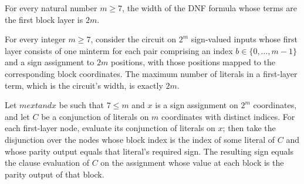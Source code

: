 \begin{theorem}
\label{FABL.blockFirstLayer_width}
\leanok
{}
For every natural number $m\geq 7$, the width of the DNF formula whose terms are the
first block layer is $2m$.
\end{theorem}

\begin{theorem}
\label{FABL.width_ac0ThresholdParityCircuit}
\leanok
{}
For every integer $m\geq 7$, consider the circuit on $2^m$ sign-valued inputs whose
first layer consists of one minterm for each pair comprising an index
$b\in\{0,\ldots,m-1\}$ and a sign assignment to $2m$ positions, with those positions
mapped to the corresponding block coordinates. The maximum number of literals in a
first-layer term, which is the circuit's width, is exactly $2m$.
\end{theorem}

\begin{theorem}
\label{FABL.eval_clauseNodeInputs}
\leanok
{}
Let $m	ext{ and }x$ be such that $7\le m$ and $x$ is a sign assignment on $2^m$
coordinates, and let $C$ be a conjunction of literals on $m$ coordinates with distinct
indices. For each first-layer node, evaluate its conjunction of literals on $x$; then
take the disjunction over the nodes whose block index is the index of some literal of
$C$ and whose parity output equals that literal's required sign. The resulting sign
equals the clause evaluation of $C$ on the assignment whose value at each block is the
parity output of that block.
\end{theorem}

